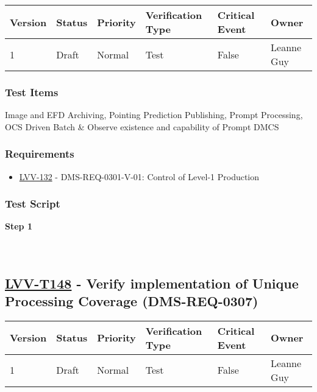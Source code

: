 \begin{longtable}[]{@{}llllll@{}}
\toprule
Version & Status & Priority & Verification Type & Critical Event &
Owner\tabularnewline
\midrule
\endhead
1 & Draft & Normal & Test & False & Leanne Guy\tabularnewline
\bottomrule
\end{longtable}

\hypertarget{test-items-123}{%
\subsubsection{Test Items}\label{test-items-123}}

Image and EFD Archiving, Pointing Prediction Publishing, Prompt
Processing, OCS Driven Batch \& Observe existence and capability of
Prompt DMCS

\hypertarget{requirements-124}{%
\subsubsection{Requirements}\label{requirements-124}}

\begin{itemize}
\tightlist
\item
  \href{https://jira.lsstcorp.org/browse/LVV-132}{LVV-132} -
  DMS-REQ-0301-V-01: Control of Level-1 Production
\end{itemize}

\hypertarget{test-script-124}{%
\subsubsection{Test Script}\label{test-script-124}}

\textbf{Step 1}\\
~\\
~\\

\hypertarget{lvv-t148---verify-implementation-of-unique-processing-coverage-dms-req-0307}{%
\subsection{\texorpdfstring{\href{https://jira.lsstcorp.org/secure/Tests.jspa\#/testCase/LVV-T148}{LVV-T148}
- Verify implementation of Unique Processing Coverage
(DMS-REQ-0307)}{LVV-T148 - Verify implementation of Unique Processing Coverage (DMS-REQ-0307)}}\label{lvv-t148---verify-implementation-of-unique-processing-coverage-dms-req-0307}}

\begin{longtable}[]{@{}llllll@{}}
\toprule
Version & Status & Priority & Verification Type & Critical Event &
Owner\tabularnewline
\midrule
\endhead
1 & Draft & Normal & Test & False & Leanne Guy\tabularnewline
\bottomrule
\end{longtable}

